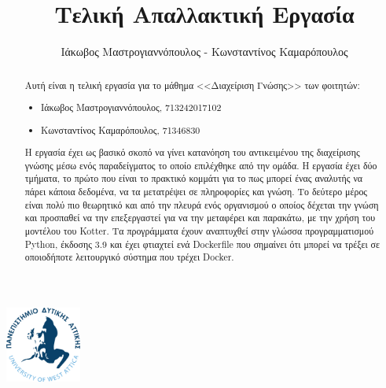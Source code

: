 \documentclass[
  11pt,
  singlespacing,
  liststotoc,
  toctotoc,
  headspline
]{fphw}
\title{Τελική Απαλλακτική Εργασία}
\author{Ιάκωβος Μαστρογιαννόπουλος - Κωνσταντίνος Καμαρόπουλος}
\institute{Πανεπιστημιο Δυτικης Αττικης \\ Τμημα Μηχανικων Πληροφορικης και Υπολογιστων}
\begin{document}
\includegraphics[width=25mm]{Figures/Logo}
\maketitle

\begin{abstract}
  Αυτή είναι η τελική εργασία για το μάθημα <<Διαχείριση Γνώσης>> των φοιτητών:
  \begin{itemize}
      \item Ιάκωβος Μαστρογιαννόπουλος, 713242017102
      \item Κωνσταντίνος Καμαρόπουλος, 71346830
  \end{itemize}

  Η εργασία έχει ως βασικό σκοπό να γίνει κατανόηση του αντικειμένου της διαχείρισης γνώσης μέσω ενός παραδείγματος το οποίο επιλέχθηκε από την ομάδα. Η εργασία έχει δύο τμήματα, το πρώτο που είναι το πρακτικό κομμάτι για το πως μπορεί ένας αναλυτής να πάρει κάποια δεδομένα, να τα μετατρέψει σε πληροφορίες και γνώση. Το δεύτερο μέρος είναι πολύ πιο θεωρητικό και από την πλευρά ενός οργανισμού ο οποίος δέχεται την γνώση και προσπαθεί να την επεξεργαστεί για να την μεταφέρει και παρακάτω, με την χρήση του μοντέλου του Kotter. Τα προγράμματα έχουν αναπτυχθεί στην γλώσσα προγραμματισμού Python, έκδοσης 3.9 και έχει φτιαχτεί ενά Dockerfile που σημαίνει ότι μπορεί να τρέξει σε οποιοδήποτε λειτουργικό σύστημα που τρέχει Docker.
\end{abstract}

\newpage
\tableofcontents
\listoffigures
\listoftables

\newpage



\appendix

\end{document}
